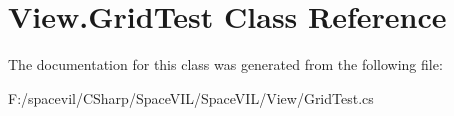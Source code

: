 \hypertarget{class_view_1_1_grid_test}{}\section{View.\+Grid\+Test Class Reference}
\label{class_view_1_1_grid_test}


The documentation for this class was generated from the following file\+:\begin{DoxyCompactItemize}
\item 
F\+:/spacevil/\+C\+Sharp/\+Space\+V\+I\+L/\+Space\+V\+I\+L/\+View/Grid\+Test.\+cs\end{DoxyCompactItemize}
